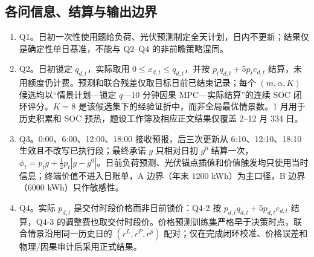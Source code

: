 \subsection{各问信息、结算与输出边界}\label{sec:assumptions-q1}
\begin{enumerate}[label=Q\arabic*:,leftmargin=3.0em,labelsep=0.4em,itemsep=0.3em]
\item Q1。日初一次性使用题给负荷、光伏预测制定全天计划，日内不更新；结果仅是确定性单日基准，不能与 Q2--Q4 的非前瞻策略混同。
\item Q2。日初锁定 $q_{d,t}$，实际取用 $0\le x_{d,t}\le q_{d,t}$，并按 $p_tq_{d,t}+5p_te_{d,t}$ 结算，未用额度仍计费。预测和联合残差仅取目标日前已结束记录；每个 $(m,\alpha,K)$ 候选均以“情景计划—锁定 $q$—10 分钟因果 MPC—实际结算”的连续 SOC 闭环评分。$K=8$ 是该候选集下的经验证折中，而非全局最优情景数。1 月用于历史积累和 SOC 预热，题设工作簿及相应正文结果仅覆盖 2--12 月 334 日。
\item Q3。0:00、6:00、12:00、18:00 接收预报，后三次更新从 6:10、12:10、18:10 生效且不改写已执行段；最终承诺 $g$ 只相对日初 $g^0$ 结算一次，$\phi_t=p_tg+\tfrac12p_t|g-g^0|$。日前负荷预测、光伏锚点插值和价值触发均只使用当时信息；终端价值不进入日账单，A 边界（年末 1200 kWh）为主口径，B 边界（6000 kWh）只作敏感性。
\item Q4。实际 $p_{d,t}$ 是交付时段价格而非日前锁价：Q4-2 按 $p_{d,t}q_{d,t}+5p_{d,t}e_{d,t}$ 结算，Q4-3 的调整费也取交付时段价。价格预测训练集严格早于决策时点，联合情景沿用同一历史日的 $(r^L,r^P,r^p)$ 配对；仅在完成闭环校准、价格误差和物理/因果审计后采用正式结果。
\end{enumerate}
